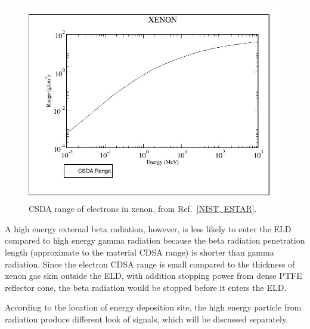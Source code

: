 \begin{figure}[!htbp]
	\centering
	\includegraphics[width=.7\textwidth,clip,trim={0 0 0 0},angle=0,origin=c]{Figures/GasTest/XenonPhysicsUseful/ElectronRange.jpg}
	\caption[CSDA range of electrons in xenon.]{CSDA range of electrons in xenon, from Ref.~\ref{NIST, ESTAR}.}
	\label{fig:xenon electron range}
\end{figure}

A high energy external beta radiation, however, is less likely to enter the ELD compared to high energy gamma radiation because the beta radiation penetration length (approximate to the material CDSA range) is shorter than gamma radiation. Since the electron CDSA range is small compared to the thickness of xenon gas skin outside the ELD, with addition stopping power from dense PTFE reflector cone, the beta radiation would be stopped before it enters the ELD. 

According to the location of energy deposition site, the high energy particle from radiation produce different look of signals, which will be discussed separately.

